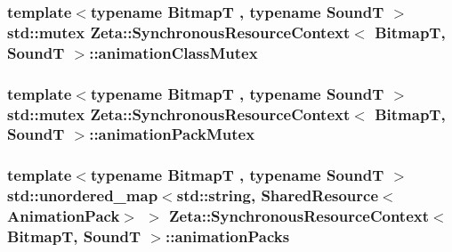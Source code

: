 \hypertarget{classZeta_1_1SynchronousResourceContext_a5bf36b85ddebabaac9ea46b7f42ec9a4}{
\subsubsection[{animation\+Class\+Mutex}]{\setlength{\rightskip}{0pt plus 5cm}template$<$typename Bitmap\+T , typename Sound\+T $>$ std\+::mutex {\bf Zeta\+::\+Synchronous\+Resource\+Context}$<$ Bitmap\+T, Sound\+T $>$\+::animation\+Class\+Mutex\hspace{0.3cm}{\ttfamily [private]}}}\label{classZeta_1_1SynchronousResourceContext_a5bf36b85ddebabaac9ea46b7f42ec9a4}
\hypertarget{classZeta_1_1SynchronousResourceContext_a48a55edb975afcd2681c98803620f834}{
\subsubsection[{animation\+Pack\+Mutex}]{\setlength{\rightskip}{0pt plus 5cm}template$<$typename Bitmap\+T , typename Sound\+T $>$ std\+::mutex {\bf Zeta\+::\+Synchronous\+Resource\+Context}$<$ Bitmap\+T, Sound\+T $>$\+::animation\+Pack\+Mutex\hspace{0.3cm}{\ttfamily [private]}}}\label{classZeta_1_1SynchronousResourceContext_a48a55edb975afcd2681c98803620f834}
\hypertarget{classZeta_1_1SynchronousResourceContext_a930d4937be63a59ffd6852085e864fc7}{
\subsubsection[{animation\+Packs}]{\setlength{\rightskip}{0pt plus 5cm}template$<$typename Bitmap\+T , typename Sound\+T $>$ std\+::unordered\+\_\+map$<$std\+::string, {\bf Shared\+Resource}$<${\bf Animation\+Pack}$>$ $>$ {\bf Zeta\+::\+Synchronous\+Resource\+Context}$<$ Bitmap\+T, Sound\+T $>$\+::animation\+Packs\hspace{0.3cm}{\ttfamily [private]}}}\label{classZeta_1_1SynchronousResourceContext_a930d4937be63a59ffd6852085e864fc7}
